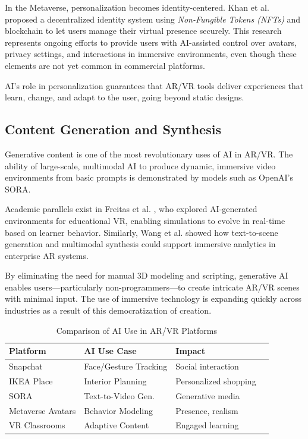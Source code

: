 \documentclass[conference]{IEEEtran}
\begin{document}
In the Metaverse, personalization becomes identity-centered. Khan et al. \cite{Khan2025} proposed a decentralized identity system using \textit{Non-Fungible Tokens (NFTs)} and blockchain to let users manage their virtual presence securely. This research represents ongoing efforts to provide users with AI-assisted control over avatars, privacy settings, and interactions in immersive environments, even though these elements are not yet common in commercial platforms.

AI's role in personalization guarantees that AR/VR tools deliver experiences that learn, change, and adapt to the user, going beyond static designs.

\subsection{Content Generation and Synthesis}
Generative content is one of the most revolutionary uses of AI in AR/VR. The ability of large-scale, multimodal AI to produce dynamic, immersive video environments from basic prompts is demonstrated by models such as OpenAI's SORA.

Academic parallels exist in Freitas et al. \cite{Freitas2025}, who explored AI-generated environments for educational VR, enabling simulations to evolve in real-time based on learner behavior. Similarly, Wang et al. \cite{Wang2025} showed how text-to-scene generation and multimodal synthesis could support immersive analytics in enterprise AR systems.

By eliminating the need for manual 3D modeling and scripting, generative AI enables users—particularly non-programmers—to create intricate AR/VR scenes with minimal input. The use of immersive technology is expanding quickly across industries as a result of this democratization of creation.

\begin{table}[htbp]
\caption{Comparison of AI Use in AR/VR Platforms}
\label{tab:ai_comparison}
\centering
\begin{tabular}{|l|l|l|l|}
\hline
\textbf{Platform} & \textbf{AI Use Case} &  \textbf{Impact} \\
\hline
Snapchat & Face/Gesture Tracking & Social interaction \\
IKEA Place & Interior Planning &  Personalized shopping \\
SORA & Text-to-Video Gen. & Generative media \\
Metaverse Avatars & Behavior Modeling  & Presence, realism \\
VR Classrooms & Adaptive Content & Engaged learning \\
\hline
\end{tabular}
\end{table}
\end{document}
